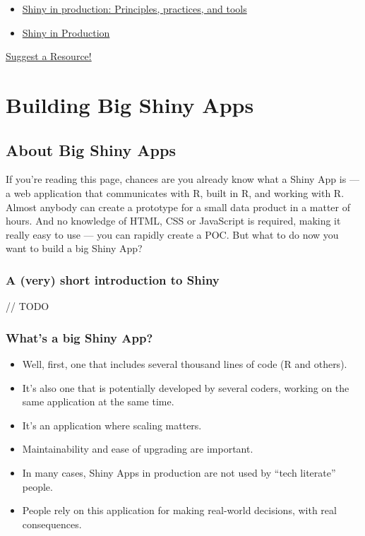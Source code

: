 \documentclass[]{book}
\providecommand{\tightlist}{%
  \setlength{\itemsep}{0pt}\setlength{\parskip}{0pt}}
\begin{document}
\begin{itemize}
\tightlist
\item
  \href{https://resources.rstudio.com/rstudio-conf-2019/shiny-in-production-principles-practices-and-tools-joe-cheng}{Shiny in production: Principles, practices, and tools}
\item
  \href{https://kellobri.github.io/shiny-prod-book/}{Shiny in Production}
\end{itemize}

\href{https://github.com/ThinkR-open/building-shiny-apps-workflow/issues}{Suggest a Resource!}

\hypertarget{part-building-big-shiny-apps}{%
\part{Building Big Shiny Apps}\label{part-building-big-shiny-apps}}

\hypertarget{bigshinyapp}{%
\chapter{About Big Shiny Apps}\label{bigshinyapp}}

If you're reading this page, chances are you already know what a Shiny App is --- a web application that communicates with R, built in R, and working with R. Almost anybody can create a prototype for a small data product in a matter of hours. And no knowledge of HTML, CSS or JavaScript is required, making it really easy to use --- you can rapidly create a POC. But what to do now you want to build a big Shiny App?

\hypertarget{a-very-short-introduction-to-shiny}{%
\section{A (very) short introduction to Shiny}\label{a-very-short-introduction-to-shiny}}

// TODO

\hypertarget{whats-a-big-shiny-app}{%
\section{What's a big Shiny App?}\label{whats-a-big-shiny-app}}

\begin{itemize}
\tightlist
\item
  Well, first, one that includes several thousand lines of code (R and others).
\item
  It's also one that is potentially developed by several coders, working on the same application at the same time.
\item
  It's an application where scaling matters.
\item
  Maintainability and ease of upgrading are important.
\item
  In many cases, Shiny Apps in production are not used by ``tech literate'' people.
\item
  People rely on this application for making real-world decisions, with real consequences.
\end{itemize}
\end{document}
